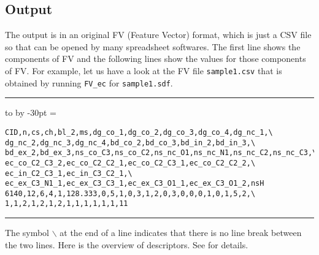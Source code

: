 \documentclass[11pt, titlepage, dvipdfmx, twoside]{article}
\newenvironment{myframe}{\begin{trivlist}\item[]
    \hrule
    \hbox to \linewidth\bgroup
    \advance\linewidth by -30pt
    \hsize=\linewidth
    \vrule\hfill
    \vbox\bgroup
    \vskip15pt
    \def\thempfootnote{\arabic{mpfootnote}}
    \begin{minipage}{\linewidth}}{%
    \end{minipage}\vskip15pt
    \egroup\hfill\vrule
    \egroup\hrule
\end{trivlist}}
\begin{document}
\subsection{Output}
The output is in an original FV (Feature Vector) format, which is just a CSV file so that can
be opened by many spreadsheet softwares.
The first line shows the components of FV and the following lines show the values
for those components of FV.
For example, let us have a look at the FV file {\tt sample1.csv} that is obtained by running {\tt FV\_ec} for
{\tt sample1.sdf}.

\begin{myframe}
\begin{verbatim}
CID,n,cs,ch,bl_2,ms,dg_co_1,dg_co_2,dg_co_3,dg_co_4,dg_nc_1,\
dg_nc_2,dg_nc_3,dg_nc_4,bd_co_2,bd_co_3,bd_in_2,bd_in_3,\
bd_ex_2,bd_ex_3,ns_co_C3,ns_co_C2,ns_nc_O1,ns_nc_N1,ns_nc_C2,ns_nc_C3,\
ec_co_C2_C3_2,ec_co_C2_C2_1,ec_co_C2_C3_1,ec_co_C2_C2_2,\
ec_in_C2_C3_1,ec_in_C3_C2_1,\
ec_ex_C3_N1_1,ec_ex_C3_C3_1,ec_ex_C3_O1_1,ec_ex_C3_O1_2,nsH
6140,12,6,4,1,128.333,0,5,1,0,3,1,2,0,3,0,0,0,1,0,1,5,2,\
1,1,2,1,2,1,2,1,1,1,1,1,1,11
\end{verbatim}
\end{myframe}

The symbol $\backslash$ at the end of a line
indicates that there is no line break between the two lines.
Here is the overview of descriptors. See \cite{BH_cyclic_arxiv} for details. 
\end{document}
